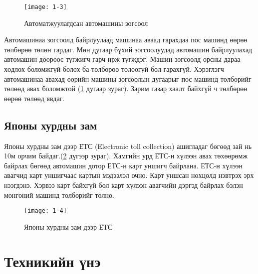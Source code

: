 \begin{figure}[!ht]
	\centering
	\texttt{[image: 1-3]}
	\caption{Автоматжуулагдсан автомашины зогсоол}
	\label{fig:1-3}
\end{figure}

Автомашинаа зогсоолд байрлуулаад машинаа аваад гарахдаа пос машинд өөрөө төлбөрөө төлөн гардаг. Мөн дугаар бүхий зогсоолуудад автомашин байрлуулахад автомашин доороос түгжигч гарч ирж түгждэг. Машин зогсоолд орсны дараа хөдлөх боломжгүй болох ба төлбөрөө төлөөгүй бол гарахгүй. Хэрэглэгч автомашинаа авахад өөрийн машины зогсоолын дугаарыг пос машинд төлбөрийг төлөөд авах боломжтой (\ref{fig:1-3} дугаар зураг). Зарим газар хаалт байхгүй ч төлбөрөө өөрөө төлөөд явдаг. 


\subsection{Японы хурдны зам}
 
Японы хурдны зам дээр ЕТС (Electronic toll collection) ашигладаг бөгөөд зай нь 10м орчим байдаг.(\ref{fig:1-4} дүгээр зураг). Хамгийн урд ЕТС-н хүлээн авах төхөөрөмж байрлах бөгөөд автомашин дотор ЕТС-н карт уншигч байрлана. ЕТС-н хүлээн авагчид карт уншигчаас картын мэдээлэл очно. Карт уншсан нөхцөлд нэвтрэх эрх нээгдэнэ. Хэрвээ карт байхгүй бол карт хүлээн авагчийн дэргэд байрлах бэлэн мөнгөний машинд төлбөрийг төлнө. 

\begin{figure}[!ht]
	\centering
	\texttt{[image: 1-4]}
	\caption{Японы хурдны зам дээр ЕТС}
	\label{fig:1-4}
\end{figure}

\section{Техникийн үнэ}

